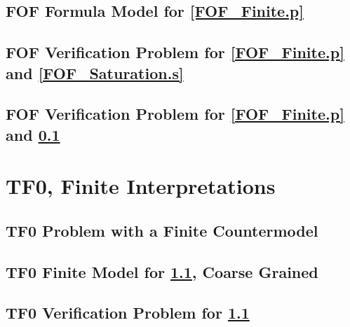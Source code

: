 \documentclass{easychair}
\begin{document}
\newpage
\subsection{FOF Formula Model for \ref{FOF_Finite.p}}
\label{FOF_Formulae.s}
\begin{small}

\end{small}

\newpage
\subsection{FOF Verification Problem for \ref{FOF_Finite.p} and \ref{FOF_Saturation.s}}
\label{FOF_Saturation.s.p}
\begin{small}

\end{small}

\newpage
\subsection{FOF Verification Problem for \ref{FOF_Finite.p} and \ref{FOF_Formulae.s}}
\label{FOF_Formulae.s.p}
\begin{small}

\end{small}

\newpage
\section{TF0, Finite Interpretations}
\label{TF0Finite}

\subsection{TF0 Problem with a Finite Countermodel}
\label{TFF_Finite.p}
\begin{small}

\end{small}

\newpage
\subsection{TF0 Finite Model for \ref{TFF_Finite.p}, Coarse Grained}
\label{TFF_Finite.s}
\begin{small}

\end{small}

\newpage
\subsection{TF0 Verification Problem for \ref{TFF_Finite.p}}
\label{TFF_Finite.s.p}
\begin{small}

\end{small}
\end{document}
